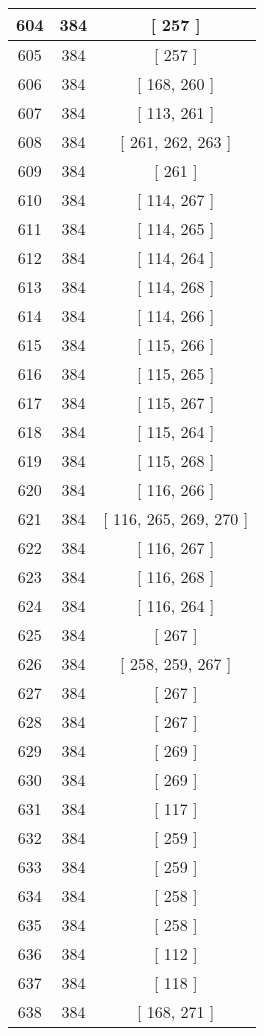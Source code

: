 \begin{center}
\begin{longtable}[H]{|| c c c ||}
\hline
604 & 384 & [ 257 ] \\ 
\hline
605 & 384 & [ 257 ] \\ 
\hline
606 & 384 & [ 168, 260 ] \\ 
\hline
607 & 384 & [ 113, 261 ] \\ 
\hline
608 & 384 & [ 261, 262, 263 ] \\ 
\hline
609 & 384 & [ 261 ] \\ 
\hline
610 & 384 & [ 114, 267 ] \\ 
\hline
611 & 384 & [ 114, 265 ] \\ 
\hline
612 & 384 & [ 114, 264 ] \\ 
\hline
613 & 384 & [ 114, 268 ] \\ 
\hline
614 & 384 & [ 114, 266 ] \\ 
\hline
615 & 384 & [ 115, 266 ] \\ 
\hline
616 & 384 & [ 115, 265 ] \\ 
\hline
617 & 384 & [ 115, 267 ] \\ 
\hline
618 & 384 & [ 115, 264 ] \\ 
\hline
619 & 384 & [ 115, 268 ] \\ 
\hline
620 & 384 & [ 116, 266 ] \\ 
\hline
621 & 384 & [ 116, 265, 269, 270 ] \\ 
\hline
622 & 384 & [ 116, 267 ] \\ 
\hline
623 & 384 & [ 116, 268 ] \\ 
\hline
624 & 384 & [ 116, 264 ] \\ 
\hline
625 & 384 & [ 267 ] \\ 
\hline
626 & 384 & [ 258, 259, 267 ] \\ 
\hline
627 & 384 & [ 267 ] \\ 
\hline
628 & 384 & [ 267 ] \\ 
\hline
629 & 384 & [ 269 ] \\ 
\hline
630 & 384 & [ 269 ] \\ 
\hline
631 & 384 & [ 117 ] \\ 
\hline
632 & 384 & [ 259 ] \\ 
\hline
633 & 384 & [ 259 ] \\ 
\hline
634 & 384 & [ 258 ] \\ 
\hline
635 & 384 & [ 258 ] \\ 
\hline
636 & 384 & [ 112 ] \\ 
\hline
637 & 384 & [ 118 ] \\ 
\hline
638 & 384 & [ 168, 271 ] \\ 

\end{longtable}
\end{center}
